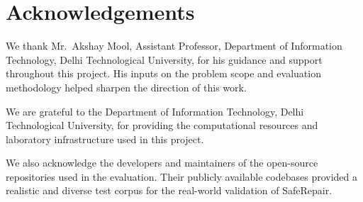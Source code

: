 \chapter*{Acknowledgements}

We thank Mr.\ Akshay Mool, Assistant Professor, Department of Information Technology, Delhi Technological University, for his guidance and support throughout this project. His inputs on the problem scope and evaluation methodology helped sharpen the direction of this work.

We are grateful to the Department of Information Technology, Delhi Technological University, for providing the computational resources and laboratory infrastructure used in this project.

We also acknowledge the developers and maintainers of the open-source repositories used in the evaluation. Their publicly available codebases provided a realistic and diverse test corpus for the real-world validation of SafeRepair.

